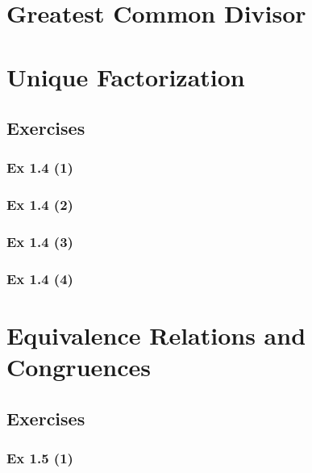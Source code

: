 {{\section{Greatest Common Divisor}\label{sec:1.3}


\newpage		%

\section{Unique Factorization}\label{sec:1.4}
\subsection*{Exercises}\label{sec:1.4_Exercises}

\subsubsection{Ex 1.4 (1)}\label{sec:Ex_1.4.1}

\subsubsection{Ex 1.4 (2)}\label{sec:Ex_1.4.2}

\subsubsection{Ex 1.4 (3)}\label{sec:Ex_1.4.3}

\subsubsection{Ex 1.4 (4)}\label{sec:Ex_1.4.4}

\newpage		%

\section{Equivalence Relations and Congruences}\label{sec:1.5}
\subsection{Exercises}\label{sec:1.5_Exercises}

\subsubsection{Ex 1.5 (1)}\label{sec:Ex_1.5.1}

}}
